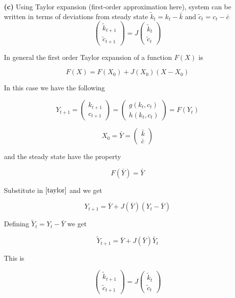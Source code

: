 \documentclass[10pt,notitlepage,onecolumn,aps,pra]{revtex4-1}
\begin{document}
    \textbf{(c)} Using Taylor expansion (first-order approximation here),
system can be written in terms of deviations from steady state
\(\tilde{k}_{t}=k_{t}-\bar{k}\) and \(\tilde{c}_{t}=c_{t}-\bar{c}\) \[
\left(\begin{array}{c}
\tilde{k}_{t+1} \\
\tilde{c}_{t+1}
\end{array}\right)=J\left(\begin{array}{c}
\tilde{k}_{t} \\
\tilde{c}_{t}
\end{array}\right)
\]

    In general the first order Taylor expansion of a function \(F(X)\) is

\begin{equation}\label{eq:taylor}
F(X) = F(X_0) + J(X_0)(X-X_0)
\end{equation}

In this case we have the following

\[ Y_{t+1} = \left(\begin{array}{c} k_{t+1} \\ c_{t+1}\end{array}\right) = \left(\begin{array}{c} g \left(k_{t}, c_{t}\right)\\
h\left(k_{t}, c_{t}\right) \end{array}\right)= F(Y_{t}) \]

\[X_0 = \bar{Y} = \left(\begin{array}{c} \bar{k} \\ \bar{c}\end{array}\right) \]

and the steady state have the property

\[F(\bar{Y}) = \bar{Y}\]

Substitute in \(\eqref{taylor}\) and we get

\[Y_{t+1} = \bar{Y} + J(\bar{Y})(Y_t - \bar{Y})\]

Defining \(\tilde{Y}_t = Y_t - \bar{Y}\) we get

\[\tilde{Y}_{t+1} = \bar{Y} + J(\bar{Y})\tilde{Y_t}\]

This is

\[
\left(\begin{array}{c}
\tilde{k}_{t+1} \\
\tilde{c}_{t+1}
\end{array}\right)=J\left(\begin{array}{c}
\tilde{k}_{t} \\
\tilde{c}_{t}
\end{array}\right)
\]
\end{document}
